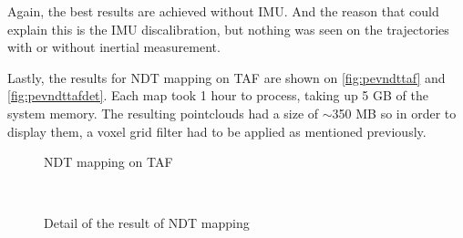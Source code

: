 Again, the best results are achieved without IMU. And the reason that could explain this is the IMU discalibration, but nothing was seen on the trajectories with or without inertial measurement.

 Lastly, the results for NDT mapping on TAF are shown on \autoref{fig:pevndttaf} and \autoref{fig:pevndttafdet}. Each map took 1 hour to process, taking up 5 GB of the system memory. The resulting pointclouds had a size of $\sim$350 MB so in order to display them, a voxel grid filter had to be applied as mentioned previously.
\begin{figure}[htb]
  \centering
  \caption{NDT mapping on TAF}
  \label{fig:pevndttaf}
\end{figure}

\begin{figure}[h!]
  \centering
   \\
  \caption{Detail of the result of NDT mapping}
  \label{fig:pevndttafdet}
\end{figure}

